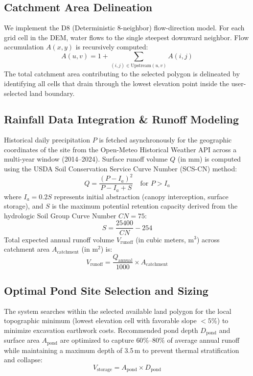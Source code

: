 \documentclass[11pt,a4paper]{article}
\begin{document}
\subsection{Catchment Area Delineation}
We implement the D8 (Deterministic 8-neighbor) flow-direction model. For each grid cell in the DEM, water flows to the single steepest downward neighbor. Flow accumulation $A(x,y)$ is recursively computed:
\begin{equation}
A(u, v) = 1 + \sum_{(i,j) \in \text{Upstream}(u,v)} A(i, j)
\end{equation}
The total catchment area contributing to the selected polygon is delineated by identifying all cells that drain through the lowest elevation point inside the user-selected land boundary.

\subsection{Rainfall Data Integration \& Runoff Modeling}
Historical daily precipitation $P$ is fetched asynchronously for the geographic coordinates of the site from the Open-Meteo Historical Weather API across a multi-year window (2014--2024). Surface runoff volume $Q$ (in mm) is computed using the USDA Soil Conservation Service Curve Number (SCS-CN) method:
\begin{equation}
Q = \frac{(P - I_a)^2}{P - I_a + S} \quad \text{for } P > I_a
\end{equation}
where $I_a = 0.2S$ represents initial abstraction (canopy interception, surface storage), and $S$ is the maximum potential retention capacity derived from the hydrologic Soil Group Curve Number $CN = 75$:
\begin{equation}
S = \frac{25400}{CN} - 254
\end{equation}
Total expected annual runoff volume $V_{\text{runoff}}$ (in cubic meters, $\text{m}^3$) across catchment area $A_{\text{catchment}}$ (in $\text{m}^2$) is:
\begin{equation}
V_{\text{runoff}} = \frac{Q_{\text{annual}}}{1000} \times A_{\text{catchment}}
\end{equation}

\subsection{Optimal Pond Site Selection and Sizing}
The system searches within the selected available land polygon for the local topographic minimum (lowest elevation cell with favorable slope $< 5\%$) to minimize excavation earthwork costs. Recommended pond depth $D_{\text{pond}}$ and surface area $A_{\text{pond}}$ are optimized to capture $60\%$--$80\%$ of average annual runoff while maintaining a maximum depth of 3.5\,m to prevent thermal stratification and collapse:
\begin{equation}
V_{\text{storage}} = A_{\text{pond}} \times D_{\text{pond}}
\end{equation}
\end{document}
